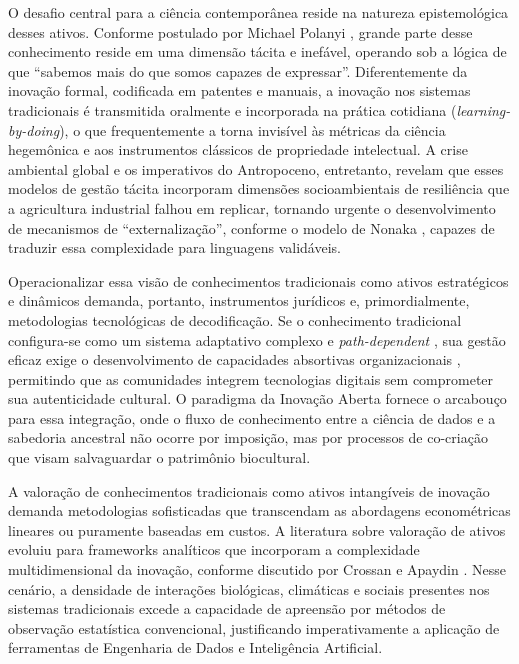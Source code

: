 O desafio central para a ciência contemporânea reside na natureza epistemológica desses ativos. Conforme postulado por Michael Polanyi \cite{Polanyi1966}, grande parte desse conhecimento reside em uma dimensão tácita e inefável, operando sob a lógica de que ``sabemos mais do que somos capazes de expressar''. Diferentemente da inovação formal, codificada em patentes e manuais, a inovação nos sistemas tradicionais é transmitida oralmente e incorporada na prática cotidiana (\textit{learning-by-doing}), o que frequentemente a torna invisível às métricas da ciência hegemônica e aos instrumentos clássicos de propriedade intelectual. A crise ambiental global e os imperativos do Antropoceno, entretanto, revelam que esses modelos de gestão tácita incorporam dimensões socioambientais de resiliência que a agricultura industrial falhou em replicar, tornando urgente o desenvolvimento de mecanismos de ``externalização'', conforme o modelo de Nonaka \cite{Nonaka1995}, capazes de traduzir essa complexidade para linguagens validáveis.

Operacionalizar essa visão de conhecimentos tradicionais como ativos estratégicos e dinâmicos demanda, portanto, instrumentos jurídicos e, primordialmente, metodologias tecnológicas de decodificação. Se o conhecimento tradicional configura-se como um sistema adaptativo complexo e \textit{path-dependent} \cite{Nelson1982}, sua gestão eficaz exige o desenvolvimento de capacidades absortivas organizacionais \cite{CohenLevinthal1990}, permitindo que as comunidades integrem tecnologias digitais sem comprometer sua autenticidade cultural. O paradigma da Inovação Aberta \cite{Chesbrough2003} fornece o arcabouço para essa integração, onde o fluxo de conhecimento entre a ciência de dados e a sabedoria ancestral não ocorre por imposição, mas por processos de co-criação que visam salvaguardar o patrimônio biocultural.

A valoração de conhecimentos tradicionais como ativos intangíveis de inovação demanda metodologias sofisticadas que transcendam as abordagens econométricas lineares ou puramente baseadas em custos. A literatura sobre valoração de ativos evoluiu para frameworks analíticos que incorporam a complexidade multidimensional da inovação, conforme discutido por Crossan e Apaydin \cite{Crossan2010}. Nesse cenário, a densidade de interações biológicas, climáticas e sociais presentes nos sistemas tradicionais excede a capacidade de apreensão por métodos de observação estatística convencional, justificando imperativamente a aplicação de ferramentas de Engenharia de Dados e Inteligência Artificial.

